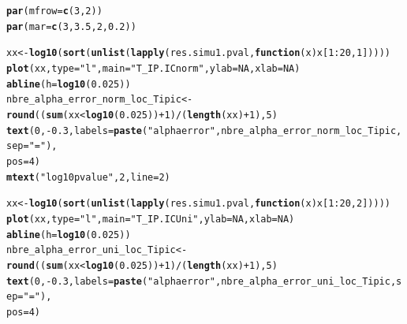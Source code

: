 \documentclass[12pt]{article}\usepackage[]{graphicx}\usepackage[]{color}
\makeatletter
\newcommand{\hlnum}[1]{\textcolor[rgb]{0.686,0.059,0.569}{#1}}%
\newcommand{\hlstr}[1]{\textcolor[rgb]{0.192,0.494,0.8}{#1}}%
\newcommand{\hlopt}[1]{\textcolor[rgb]{0,0,0}{#1}}%
\newcommand{\hlstd}[1]{\textcolor[rgb]{0.345,0.345,0.345}{#1}}%
\newcommand{\hlkwa}[1]{\textcolor[rgb]{0.161,0.373,0.58}{\textbf{#1}}}%
\newcommand{\hlkwb}[1]{\textcolor[rgb]{0.69,0.353,0.396}{#1}}%
\newcommand{\hlkwc}[1]{\textcolor[rgb]{0.333,0.667,0.333}{#1}}%
\newcommand{\hlkwd}[1]{\textcolor[rgb]{0.737,0.353,0.396}{\textbf{#1}}}%
\newenvironment{kframe}{%
 \def\at@end@of@kframe{}%
 \ifinner\ifhmode%
  \def\at@end@of@kframe{\end{minipage}}%
  \begin{minipage}{\columnwidth}%
 \fi\fi%
 \def\FrameCommand##1{\hskip\@totalleftmargin \hskip-\fboxsep
 \colorbox{shadecolor}{##1}\hskip-\fboxsep
     \hskip-\linewidth \hskip-\@totalleftmargin \hskip\columnwidth}%
 \MakeFramed {\advance\hsize-\width
   \@totalleftmargin\z@ \linewidth\hsize
   \@setminipage}}%
 {\par\unskip\endMakeFramed%
 \at@end@of@kframe}
\newenvironment{knitrout}{}{} %
\makeatother
\begin{document}
\begin{knitrout}\small
{}\color{fgcolor}\begin{kframe}
\begin{alltt}
\hlkwd{par}\hlstd{(}\hlkwc{mfrow} \hlstd{=} \hlkwd{c}\hlstd{(}\hlnum{3}\hlstd{,} \hlnum{2}\hlstd{))}
\hlkwd{par}\hlstd{(}\hlkwc{mar} \hlstd{=} \hlkwd{c}\hlstd{(}\hlnum{3}\hlstd{,} \hlnum{3.5}\hlstd{,} \hlnum{2}\hlstd{,} \hlnum{0.2}\hlstd{))}

\hlstd{xx} \hlkwb{<-} \hlkwd{log10}\hlstd{(}\hlkwd{sort}\hlstd{(}\hlkwd{unlist}\hlstd{(}\hlkwd{lapply}\hlstd{(res.simu1.pval,} \hlkwa{function}\hlstd{(}\hlkwc{x}\hlstd{) x[}\hlnum{1}\hlopt{:}\hlnum{20}\hlstd{,} \hlnum{1}\hlstd{]))))}
\hlkwd{plot}\hlstd{(xx,} \hlkwc{type} \hlstd{=} \hlstr{"l"}\hlstd{,} \hlkwc{main} \hlstd{=} \hlstr{"T_IP.IC norm"}\hlstd{,} \hlkwc{ylab} \hlstd{=} \hlnum{NA} \hlstd{,} \hlkwc{xlab} \hlstd{=} \hlnum{NA}\hlstd{)}
\hlkwd{abline}\hlstd{(}\hlkwc{h} \hlstd{=} \hlkwd{log10}\hlstd{(}\hlnum{0.025}\hlstd{))}
\hlstd{nbre_alpha_error_norm_loc_Tipic} \hlkwb{<-} \hlkwd{round}\hlstd{((}\hlkwd{sum}\hlstd{(xx} \hlopt{<} \hlkwd{log10}\hlstd{(}\hlnum{0.025}\hlstd{))} \hlopt{+}\hlnum{1} \hlstd{)} \hlopt{/} \hlstd{(}\hlkwd{length}\hlstd{(xx)}\hlopt{+}\hlnum{1}\hlstd{),} \hlnum{5}\hlstd{)}
\hlkwd{text}\hlstd{(}\hlnum{0}\hlstd{,} \hlopt{-}\hlnum{0.3}\hlstd{,} \hlkwc{labels} \hlstd{=} \hlkwd{paste}\hlstd{(}\hlstr{"alpha error"}\hlstd{, nbre_alpha_error_norm_loc_Tipic,} \hlkwc{sep} \hlstd{=} \hlstr{" = "}\hlstd{),}
     \hlkwc{pos} \hlstd{=} \hlnum{4}\hlstd{)}
\hlkwd{mtext}\hlstd{(}\hlstr{"log10 pvalue"}\hlstd{,} \hlnum{2}\hlstd{,} \hlkwc{line} \hlstd{=} \hlnum{2}\hlstd{)}

\hlstd{xx} \hlkwb{<-} \hlkwd{log10}\hlstd{(}\hlkwd{sort}\hlstd{(}\hlkwd{unlist}\hlstd{(}\hlkwd{lapply}\hlstd{(res.simu1.pval,} \hlkwa{function}\hlstd{(}\hlkwc{x}\hlstd{) x[}\hlnum{1}\hlopt{:}\hlnum{20}\hlstd{,} \hlnum{2}\hlstd{]))))}
\hlkwd{plot}\hlstd{(xx,} \hlkwc{type} \hlstd{=} \hlstr{"l"}\hlstd{,} \hlkwc{main} \hlstd{=} \hlstr{"T_IP.IC Uni"}\hlstd{,} \hlkwc{ylab} \hlstd{=} \hlnum{NA}\hlstd{,} \hlkwc{xlab} \hlstd{=} \hlnum{NA}\hlstd{)}
\hlkwd{abline}\hlstd{(}\hlkwc{h} \hlstd{=} \hlkwd{log10}\hlstd{(}\hlnum{0.025}\hlstd{))}
\hlstd{nbre_alpha_error_uni_loc_Tipic} \hlkwb{<-} \hlkwd{round}\hlstd{((}\hlkwd{sum}\hlstd{(xx} \hlopt{<} \hlkwd{log10}\hlstd{(}\hlnum{0.025}\hlstd{))} \hlopt{+}\hlnum{1} \hlstd{)} \hlopt{/} \hlstd{(}\hlkwd{length}\hlstd{(xx)}\hlopt{+}\hlnum{1}\hlstd{),} \hlnum{5}\hlstd{)}
\hlkwd{text}\hlstd{(}\hlnum{0}\hlstd{,} \hlopt{-}\hlnum{0.3}\hlstd{,} \hlkwc{labels} \hlstd{=} \hlkwd{paste}\hlstd{(}\hlstr{"alpha error"}\hlstd{, nbre_alpha_error_uni_loc_Tipic,} \hlkwc{sep} \hlstd{=} \hlstr{" = "}\hlstd{),}
     \hlkwc{pos} \hlstd{=} \hlnum{4}\hlstd{)}


\end{alltt}
\end{kframe}
\end{knitrout}
\end{document}
